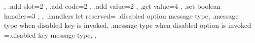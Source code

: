 {{{{      }
    },
    .add slot={2}{
    },
    .add code={2}{
    },
    .add value={2}{
    },
    .get value={4}{
    },
    .set boolean handler={3}{
    },
  },
  .handlers let reserved={
    {.disabled option message type,
      .message type when disabled key is invoked,
      .message type when disabled option is invoked
    }=.disabled key message type,
  },
}

